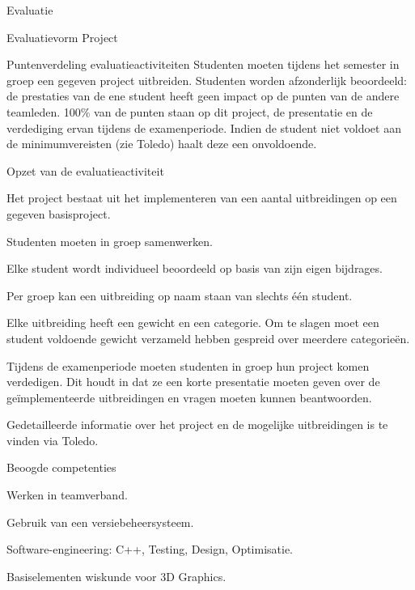 \documentclass{studiewijzer}
\begin{document}
\begin{categorybox}{Evaluatie}
    \begin{category}{Evaluatievorm}
        Project
    \end{category}

    \begin{category}{Puntenverdeling evaluatieactiviteiten}
        Studenten moeten tijdens het semester in groep een gegeven project uitbreiden.
        Studenten worden afzonderlijk beoordeeld: de prestaties van de ene student heeft geen impact op de punten van de andere teamleden.
        100\% van de punten staan op dit project, de presentatie en de verdediging ervan tijdens de examenperiode.
        Indien de student niet voldoet aan de minimumvereisten (zie Toledo) haalt deze een onvoldoende.
    \end{category}

    \begin{category}{Opzet van de evaluatieactiviteit}
        \begin{items}
            \item Het project bestaat uit het implementeren van een aantal uitbreidingen op een gegeven basisproject.
            \item Studenten moeten in groep samenwerken.
            \item Elke student wordt individueel beoordeeld op basis van zijn eigen bijdrages.
            \item Per groep kan een uitbreiding op naam staan van slechts één student.
            \item Elke uitbreiding heeft een gewicht en een categorie. Om te slagen moet een student voldoende gewicht verzameld hebben gespreid over meerdere categorieën.
            \item Tijdens de examenperiode moeten studenten in groep hun project komen verdedigen. Dit houdt in dat ze een korte presentatie moeten geven over de geïmplementeerde uitbreidingen en vragen moeten kunnen beantwoorden.
            \item Gedetailleerde informatie over het project en de mogelijke uitbreidingen is te vinden via Toledo.
        \end{items}
    \end{category}

    \begin{category}{Beoogde competenties}
        \begin{items}
            \item Werken in teamverband.
            \item Gebruik van een versiebeheersysteem.
            \item Software-engineering: C++, Testing, Design, Optimisatie.
            \item Basiselementen wiskunde voor 3D Graphics.
        \end{items}
    \end{category}


\end{categorybox}
\end{document}
